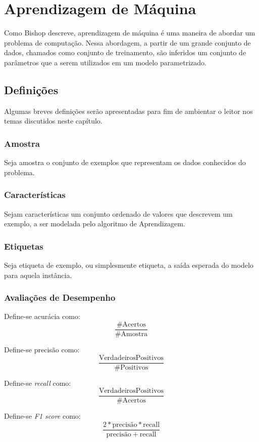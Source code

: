 \chapter{Aprendizagem de Máquina}
Como Bishop \cite{bishop2006pattern} descreve, aprendizagem de máquina é uma maneira de abordar um problema de computação. Nessa abordagem, a partir de um grande conjunto de dados, chamados como conjunto de treinamento, são inferidos um conjunto de parâmetros que a serem utilizados em um modelo parametrizado.

\section{Definições}

Algumas breves definições serão apresentadas para fim de ambientar o leitor nos temas discutidos neste capítulo.

\subsection{Amostra}
Seja amostra o conjunto de exemplos que representam os dados conhecidos do problema.

\subsection{Características}
Sejam características um conjunto ordenado de valores que descrevem um exemplo, a ser modelada pelo algoritmo de Aprendizagem.

\subsection{Etiquetas}
Seja etiqueta de exemplo, ou simplesmente etiqueta, a saída esperada do modelo para aquela instância.

\subsection{Avaliações de Desempenho}
Define-se acurácia como:
\[\frac{\mathrm{\#Acertos}}{\mathrm{\#Amostra}}\]

Define-se precisão como:
\[\frac{\mathrm{Verdadeiros Positivos}}{\mathrm{\#Positivos}}\]

Define-se \textit{recall} como:
\[\frac{\mathrm{Verdadeiros Positivos}}{\mathrm{\#Acertos}}\]

Define-se \textit{F1 score} como:
\[\frac{2 * \mathrm{precisão} * \mathrm{recall}}{\mathrm{precisão} + \mathrm{recall}}\]

